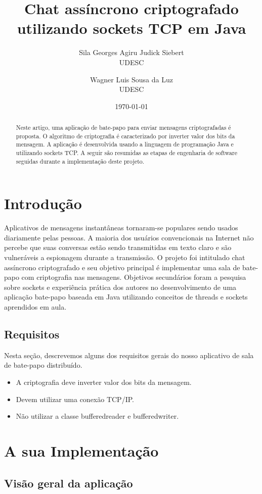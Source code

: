 \documentclass[a4paper,12pt]{article}
\title{Chat assíncrono criptografado utilizando  sockets TCP em Java}
\author{Sila Georges Agiru Judick Siebert\\UDESC
        \and Wagner Luis Sousa da Luz \\UDESC}
\date{\today}
\begin{document}
\maketitle

\begin{abstract}
Neste artigo, uma aplicação de bate-papo para enviar mensagens  criptografadas é proposta.
O algoritmo de criptografia é caracterizado por inverter valor dos bits da mensagem. A aplicação é desenvolvida usando a linguagem de programação Java e utilizando sockets TCP. A seguir são resumidas as etapas de engenharia de software seguidas durante a implementação deste projeto.
\end{abstract}


\section{Introdução}
Aplicativos de mensagens instantâneas tornaram-se populares sendo usados diariamente pelas pessoas. A maioria dos usuários convencionais na Internet não percebe que suas conversas estão sendo transmitidas em texto claro e são vulneráveis a espionagem durante a transmissão.
O projeto foi intitulado  chat assíncrono criptografado e seu objetivo principal é implementar uma sala de bate-papo com criptografia nas mensagens. Objetivos secundários foram a pesquisa sobre sockets e experiência prática dos autores no desenvolvimento de uma aplicação bate-papo baseada em Java utilizando conceitos de threads e sockets aprendidos em aula.
\subsection{Requisitos}
Nesta seção, descrevemos alguns dos requisitos gerais
do nosso aplicativo de sala de bate-papo distribuído.
\begin{itemize}
\item A criptografia deve inverter valor dos bits da mensagem.
\item Devem utilizar uma conexão TCP/IP.
\item Não utilizar a classe bufferedreader e bufferedwriter.
\end{itemize}



\section{A sua Implementação}
\subsection{Visão geral da aplicação}
\end{document}
